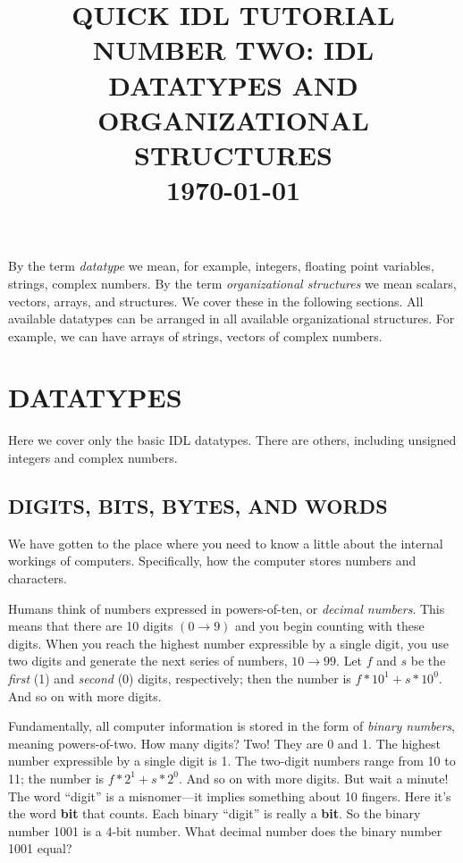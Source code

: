 \documentclass[psfig,preprint]{aastex}
\begin{document}
\title{\bf QUICK IDL TUTORIAL NUMBER TWO: IDL DATATYPES AND
ORGANIZATIONAL STRUCTURES\\ \today}

\tableofcontents

	By the term {\it datatype} we mean, for example, integers,
floating point variables, strings, complex numbers.  By the term {\it
organizational structures} we mean scalars, vectors, arrays, and
structures.  We cover these in the following sections.  All
available datatypes can be arranged in all available organizational
structures.  For example, we can have arrays of strings, vectors of
complex numbers. 

\section {DATATYPES}

	Here we cover only the basic IDL datatypes.  There are others,
including unsigned integers and complex numbers. 

\subsection{ DIGITS, BITS, BYTES, AND WORDS}

	We have gotten to the place where you need to know a little
about the internal workings of computers. Specifically, how the computer
stores numbers and characters.

	Humans think of numbers expressed in powers-of-ten, or {\it
decimal numbers}.  This means that there are 10 digits $(0 \rightarrow
9)$ and you begin counting with these digits.  When you reach the
highest number expressible by a single digit, you use two digits and
generate the next series of numbers, $10 \rightarrow 99$.  Let $f$ and
$s$ be the {\it first} (1) and {\it second} (0) digits, respectively; then the
number is $f*10^1 + s*10^0$.  And so on with more digits. 

	Fundamentally, all computer information is stored in the form of
{\it binary numbers}, meaning powers-of-two.  How many digits? Two! They
are 0 and 1.  The highest number expressible by a single digit is 1. 
The two-digit numbers range from 10 to 11; the number is $f*2^1 + s*2^0$.  And
so on with more digits.  But wait a minute! The word ``digit'' is a
misnomer---it implies something about 10 fingers.  Here it's the word
{\bf bit} that counts.  Each binary ``digit'' is really a {\bf bit}.  So
the binary number 1001 is a 4-bit number.  What decimal number does the
binary number 1001 equal?
\end{document}
